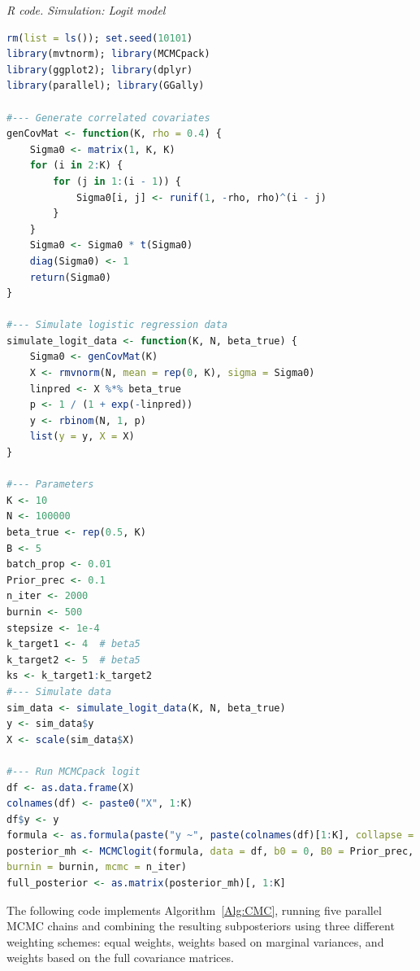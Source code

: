 \begin{tcolorbox}[enhanced,width=4.67in,center upper,
	fontupper=\large\bfseries,drop shadow southwest,sharp corners]
	\textit{R code. Simulation: Logit model}
	\begin{VF}
		\begin{lstlisting}[language=R]
rm(list = ls()); set.seed(10101)
library(mvtnorm); library(MCMCpack)
library(ggplot2); library(dplyr)
library(parallel); library(GGally)

#--- Generate correlated covariates
genCovMat <- function(K, rho = 0.4) {
	Sigma0 <- matrix(1, K, K)
	for (i in 2:K) {
		for (j in 1:(i - 1)) {
			Sigma0[i, j] <- runif(1, -rho, rho)^(i - j)
		}
	}
	Sigma0 <- Sigma0 * t(Sigma0)
	diag(Sigma0) <- 1
	return(Sigma0)
}

#--- Simulate logistic regression data
simulate_logit_data <- function(K, N, beta_true) {
	Sigma0 <- genCovMat(K)
	X <- rmvnorm(N, mean = rep(0, K), sigma = Sigma0)
	linpred <- X %*% beta_true
	p <- 1 / (1 + exp(-linpred))
	y <- rbinom(N, 1, p)
	list(y = y, X = X)
}

#--- Parameters
K <- 10
N <- 100000
beta_true <- rep(0.5, K)
B <- 5
batch_prop <- 0.01
Prior_prec <- 0.1
n_iter <- 2000
burnin <- 500
stepsize <- 1e-4
k_target1 <- 4  # beta5
k_target2 <- 5  # beta5
ks <- k_target1:k_target2
#--- Simulate data
sim_data <- simulate_logit_data(K, N, beta_true)
y <- sim_data$y
X <- scale(sim_data$X)

#--- Run MCMCpack logit
df <- as.data.frame(X)
colnames(df) <- paste0("X", 1:K)
df$y <- y
formula <- as.formula(paste("y ~", paste(colnames(df)[1:K], collapse = " + "), "-1"))
posterior_mh <- MCMClogit(formula, data = df, b0 = 0, B0 = Prior_prec,
burnin = burnin, mcmc = n_iter)
full_posterior <- as.matrix(posterior_mh)[, 1:K]
\end{lstlisting}
	\end{VF}
\end{tcolorbox}

The following code implements Algorithm~\ref{Alg:CMC}, running five parallel MCMC chains and combining the resulting subposteriors using three different weighting schemes: equal weights, weights based on marginal variances, and weights based on the full covariance matrices.

